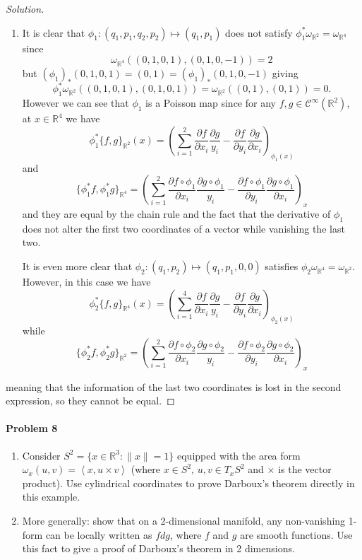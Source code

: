 \begin{proof}[Solution]
\begin{enumerate}[label=\alph*.]
	\item It is clear that $\phi_1:(q_1,p_1,q_2,p_2)\mapsto (q_1,p_1)$ does not satisfy $\phi_1^*\omega_{\mathbb{R}^{2}}=\omega_{\mathbb{R}^{4}}$ since 
		\[\omega_{\mathbb{R}^{4}}((0,1,0,1),(0,1,0,-1))=2\]
		but $(\phi_1)_{*}(0,1,0,1)=(0,1)=(\phi_1)_*(0,1,0,-1)$ giving 
		\[\phi_1^*\omega_{\mathbb{R}^{2}}((0,1,0,1),(0,1,0,1))=\omega_{\mathbb{R}^{2}}((0,1),(0,1))=0.\]
		However we can see that $\phi_1$ is a Poisson map since for any $f,g\in\mathcal{C}^\infty(\mathbb{R}^{2})$, at $x\in\mathbb{R}^{4}$ we have
		\[\phi_1^*\{f,g\}_{\mathbb{R}^{2}}(x)=\left( \sum_{i=1}^2\frac{\partial f}{\partial x_i}\frac{\partial g}{y_i}-\frac{\partial f}{\partial y_i}\frac{\partial g}{\partial x_i} \right)_{\phi_1(x)} \]
and
\[\{\phi_1^*f,\phi_1^*g\}_{\mathbb{R}^{4}} =\left( \sum_{i=1}^2\frac{\partial f\circ \phi_1}{\partial x_i}\frac{\partial g\circ \phi_1}{y_i}-\frac{\partial f\circ \phi_1}{\partial y_i}\frac{\partial g\circ \phi_1}{\partial x_i} \right)_x\]
and they are equal by the chain rule and the fact that the derivative of $\phi_1$ does not alter the first two coordinates of a vector while vanishing the last two.


		It is even more clear that $\phi_2:(q_1,p_2)\mapsto (q_1,p_1,0,0)$ satisfies $\phi_2\omega_{\mathbb{R}^{4}}=\omega_{\mathbb{R}^{2}}$. However, in this case we have
		\[\phi_2^*\{f,g\}_{\mathbb{R}^{4}}(x)=\left( \sum_{i=1}^4\frac{\partial f}{\partial x_i}\frac{\partial g}{y_i}-\frac{\partial f}{\partial y_i}\frac{\partial g}{\partial x_i} \right)_{\phi_2(x)} \]
		while
\[\{\phi_2^*f,\phi_2^*g\}_{\mathbb{R}^{2}} =\left( \sum_{i=1}^2\frac{\partial f\circ \phi_2}{\partial x_i}\frac{\partial g\circ \phi_2}{y_i}-\frac{\partial f\circ \phi_2}{\partial y_i}\frac{\partial g\circ \phi_2}{\partial x_i} \right)_x\]
	\end{enumerate}
	meaning that the information of the last two coordinates is lost in the second expression, so they cannot be equal.
	\end{proof}

\paragraph{Problem 8} \leavevmode 

\begin{enumerate}[label=\alph*.]
	\item Consider $S^{2}=\{x\in\mathbb{R}^{3}:\|x\|=1\}$ equipped with the area form $\omega_x(u,v)=\left<x,u\times v\right> $ (where $x\in S^{2}$, $u,v\in T_xS^{2}$ and $\times $ is the vector product). Use cylindrical coordinates to prove Darboux's theorem directly in this example.

	\item More generally: show that on a 2-dimensional manifold, any non-vanishing 1-form can be locally written as $fdg$, where $f$ and $g$ are smooth functions. Use this fact to give a proof of Darboux's theorem in 2 dimensions.
\end{enumerate}

